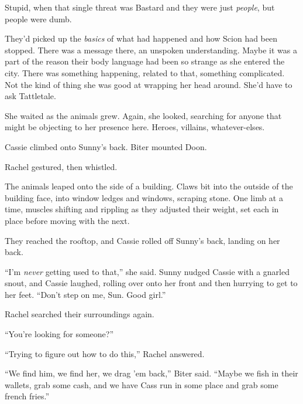 Stupid, when that single threat was Bastard and they were just \emph{people}, but people were dumb.



They'd picked up the \emph{basics} of what had happened and how Scion had been stopped.  There was a message there, an unspoken understanding.  Maybe it was a part of the reason their body language had been so strange as she entered the city.  There was something happening, related to that, something complicated.  Not the kind of thing she was good at wrapping her head around.  She'd have to ask Tattletale.



She waited as the animals grew.  Again, she looked, searching for anyone that might be objecting to her presence here.  Heroes, villains, whatever-elses.



Cassie climbed onto Sunny's back.  Biter mounted Doon.



Rachel gestured, then whistled.



The animals leaped onto the side of a building.  Claws bit into the outside of the building face, into window ledges and windows, scraping stone.  One limb at a time, muscles shifting and rippling as they adjusted their weight, set each in place before moving with the next.



They reached the rooftop, and Cassie rolled off Sunny's back, landing on her back.



``I'm \emph{never} getting used to that,'' she said.  Sunny nudged Cassie with a gnarled snout, and Cassie laughed, rolling over onto her front and then hurrying to get to her feet.  ``Don't step on me, Sun.  Good girl.''



Rachel searched their surroundings again.



``You're looking for someone?''



``Trying to figure out how to do this,'' Rachel answered.



``We find him, we find her, we drag 'em back,'' Biter said.  ``Maybe we fish in their wallets, grab some cash, and we have Cass run in some place and grab some french fries.''



